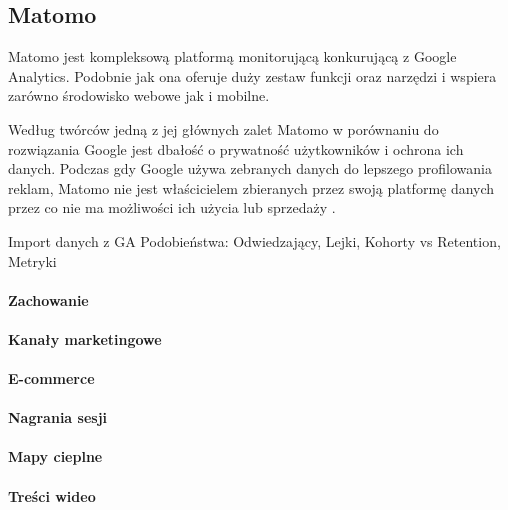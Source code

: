 \subsection{Matomo}
Matomo jest kompleksową platformą monitorującą konkurującą z Google Analytics. Podobnie jak ona oferuje duży zestaw funkcji oraz narzędzi i wspiera zarówno środowisko webowe jak i mobilne. 

Według twórców jedną z jej głównych zalet Matomo w porównaniu do rozwiązania Google jest dbałość o prywatność użytkowników i ochrona ich danych. Podczas gdy Google używa zebranych danych do lepszego profilowania reklam, Matomo nie jest właścicielem zbieranych przez swoją platformę danych przez co nie ma możliwości ich użycia lub sprzedaży \cite{Matomo_Data}.

Import danych z GA
Podobieństwa: Odwiedzający, Lejki, Kohorty vs Retention, Metryki

\paragraph{Zachowanie}

\paragraph{Kanały marketingowe}

\paragraph{E-commerce}

\paragraph{Nagrania sesji}

\paragraph{Mapy cieplne}

\paragraph{Treści wideo}

